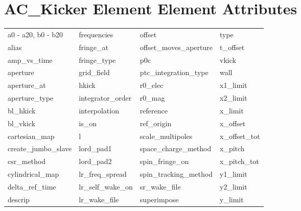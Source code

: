  \section{AC_Kicker Element Element Attributes}
 \label{s:list.ac.kicker}
 
 \begin{tabular}{llll} \toprule
a0 - a20, b0 - b20          & frequencies                 & offset                      & type                        \\
alias                       & fringe_at                   & offset_moves_aperture       & t_offset                    \\
amp_vs_time                 & fringe_type                 & p0c                         & vkick                       \\
aperture                    & grid_field                  & ptc_integration_type        & wall                        \\
aperture_at                 & hkick                       & r0_elec                     & x1_limit                    \\
aperture_type               & integrator_order            & r0_mag                      & x2_limit                    \\
bl_hkick                    & interpolation               & reference                   & x_limit                     \\
bl_vkick                    & is_on                       & ref_origin                  & x_offset                    \\
cartesian_map               & l                           & scale_multipoles            & x_offset_tot                \\
create_jumbo_slave          & lord_pad1                   & space_charge_method         & x_pitch                     \\
csr_method                  & lord_pad2                   & spin_fringe_on              & x_pitch_tot                 \\
cylindrical_map             & lr_freq_spread              & spin_tracking_method        & y1_limit                    \\
delta_ref_time              & lr_self_wake_on             & sr_wake_file                & y2_limit                    \\
descrip                     & lr_wake_file                & superimpose                 & y_limit                     \\

\end{tabular}
